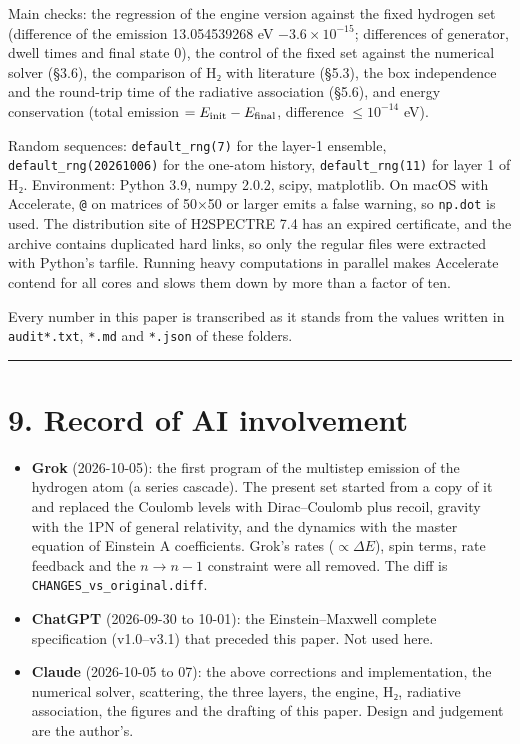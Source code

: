 \documentclass[
  a4paper,
]{article}
\providecommand{\tightlist}{%
  \setlength{\itemsep}{0pt}\setlength{\parskip}{0pt}}
\begin{document}
Main checks: the regression of the engine version against the fixed
hydrogen set (difference of the emission 13.054539268 eV
\(-3.6\times10^{-15}\); differences of generator, dwell times and final
state 0), the control of the fixed set against the numerical solver
(§3.6), the comparison of H₂ with literature (§5.3), the box
independence and the round-trip time of the radiative association
(§5.6), and energy conservation (total emission
\(=E_{\rm init}-E_{\rm final}\), difference \(\le10^{-14}\) eV).

Random sequences: \texttt{default\_rng(7)} for the layer-1 ensemble,
\texttt{default\_rng(20261006)} for the one-atom history,
\texttt{default\_rng(11)} for layer 1 of H₂. Environment: Python 3.9,
numpy 2.0.2, scipy, matplotlib. On macOS with Accelerate, \texttt{@} on
matrices of 50×50 or larger emits a false warning, so \texttt{np.dot} is
used. The distribution site of H2SPECTRE 7.4 has an expired certificate,
and the archive contains duplicated hard links, so only the regular
files were extracted with Python's tarfile. Running heavy computations
in parallel makes Accelerate contend for all cores and slows them down
by more than a factor of ten.

Every number in this paper is transcribed as it stands from the values
written in \texttt{audit*.txt}, \texttt{*.md} and \texttt{*.json} of
these folders.

\begin{center}\rule{0.5\linewidth}{0.5pt}\end{center}

\section{9. Record of AI involvement}\label{record-of-ai-involvement}

\begin{itemize}
\tightlist
\item
  \textbf{Grok} (2026-10-05): the first program of the multistep
  emission of the hydrogen atom (a series cascade). The present set
  started from a copy of it and replaced the Coulomb levels with
  Dirac--Coulomb plus recoil, gravity with the 1PN of general
  relativity, and the dynamics with the master equation of Einstein A
  coefficients. Grok's rates (\(\propto\Delta E\)), spin terms, rate
  feedback and the \(n\to n-1\) constraint were all removed. The diff is
  \texttt{CHANGES\_vs\_original.diff}.
\item
  \textbf{ChatGPT} (2026-09-30 to 10-01): the Einstein--Maxwell complete
  specification (v1.0--v3.1) that preceded this paper. Not used here.
\item
  \textbf{Claude} (2026-10-05 to 07): the above corrections and
  implementation, the numerical solver, scattering, the three layers,
  the engine, H₂, radiative association, the figures and the drafting of
  this paper. Design and judgement are the author's.
\end{itemize}
\end{document}
